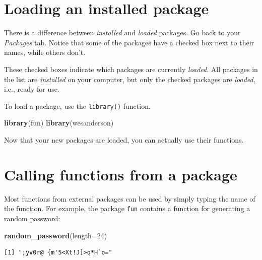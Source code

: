 \documentclass[
]{book}
\newenvironment{Shaded}{\begin{snugshade}}{\end{snugshade}}
\newcommand{\DataTypeTok}[1]{\textcolor[rgb]{0.13,0.29,0.53}{#1}}
\newcommand{\DecValTok}[1]{\textcolor[rgb]{0.00,0.00,0.81}{#1}}
\newcommand{\KeywordTok}[1]{\textcolor[rgb]{0.13,0.29,0.53}{\textbf{#1}}}
\newcommand{\NormalTok}[1]{#1}
\begin{document}
\hypertarget{loading-an-installed-package}{%
\section*{Loading an installed package}\label{loading-an-installed-package}}

There is a difference between \emph{installed} and \emph{loaded} packages. Go back to your \emph{Packages} tab. Notice that some of the packages have a checked box next to their names, while others don't.

These checked boxes indicate which packages are currently \emph{loaded}. All packages in the list are \emph{installed} on your computer, but only the checked packages are \emph{loaded}, i.e., ready for use.

To load a package, use the \texttt{library()} function.

\begin{Shaded}
\begin{Highlighting}[]
\KeywordTok{library}\NormalTok{(fun)}
\KeywordTok{library}\NormalTok{(wesanderson)}
\end{Highlighting}
\end{Shaded}

Now that your new packages are loaded, you can actually use their functions.

\hypertarget{calling-functions-from-a-package}{%
\section*{Calling functions from a package}\label{calling-functions-from-a-package}}

Most functions from external packages can be used by simply typing the name of the function. For example, the package \texttt{fun} contains a function for generating a random password:

\begin{Shaded}
\begin{Highlighting}[]
\KeywordTok{random_password}\NormalTok{(}\DataTypeTok{length=}\DecValTok{24}\NormalTok{)}
\end{Highlighting}
\end{Shaded}

\begin{verbatim}
[1] ";yv0r@ {m'5<Xt!J]>q*H`o="
\end{verbatim}
\end{document}
